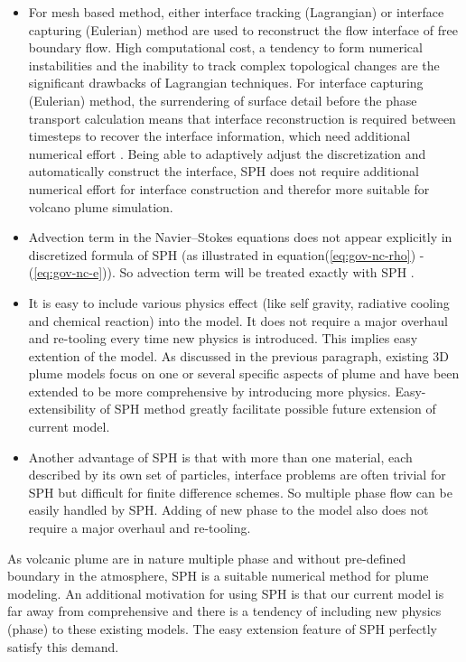 \documentclass[10pt,a4paper]{article}
\begin{document}
\begin{itemize}
\item For mesh based method, either interface tracking (Lagrangian) \cite{harlow1965numerical,cheng1995simplified,wrobel1991computational} or interface capturing (Eulerian) \cite{hirt1981volume, youngs1982time, gerlach2006comparison,gopala2008volume} method are used to reconstruct the flow interface of free boundary flow. High computational cost, a tendency to form numerical instabilities and the inability to track complex topological changes are the significant drawbacks of Lagrangian techniques\cite{unverdi1992front, anderson1998diffuse, hirt1981volume}. For interface capturing (Eulerian) method, the surrendering of surface detail before the phase transport calculation means that interface reconstruction is required between timesteps to recover the interface information, which need additional numerical effort \cite{ho2015intersection, hirt1981volume, youngs1982time}. Being able to adaptively adjust the discretization and automatically construct the interface, SPH does not require additional numerical effort for interface construction and therefor more suitable for volcano plume simulation.
\item Advection term in the Navier–Stokes equations does not appear explicitly in discretized formula of SPH (as illustrated in equation(\ref{eq:gov-nc-rho}) - (\ref{eq:gov-nc-e})). So advection term will be treated exactly with SPH \cite{monaghan2005smoothed}.
\item It is easy to include various physics effect (like self gravity, radiative cooling and chemical reaction) into the model. It does not require a major overhaul and re-tooling every time new physics is introduced\citep{monaghan1995sph}. This implies easy extention of the model. As discussed in the previous paragraph, existing 3D plume models focus on one or several specific aspects of plume and have been extended to be more comprehensive by introducing more physics. Easy-extensibility of SPH method greatly facilitate possible future extension of current model.
\item Another advantage of SPH is that with more than one material, each described by its own set of particles, interface problems are often trivial for SPH but difficult for finite difference schemes. So multiple phase flow can be easily handled by SPH. Adding of new phase to the model also does not require a major overhaul and re-tooling.
\end{itemize}
As volcanic plume are in nature multiple phase and without pre-defined boundary in the atmosphere, SPH is a suitable numerical method for plume modeling. An additional motivation for using SPH is that our current model is far away from comprehensive and there is a tendency of including new physics (phase) to these existing models. The easy extension feature of SPH perfectly satisfy this demand.\\
\end{document}
